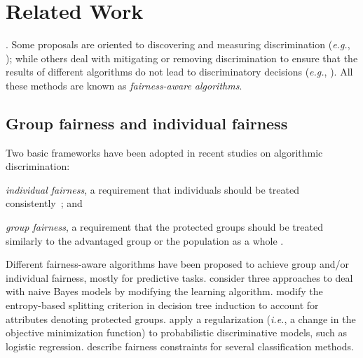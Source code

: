 \section{Related Work}\label{sec:related-work}

\cite{tuto2016,rosenbaum2019algorithmic}. Some proposals are oriented to discovering and measuring discrimination ({\em e.g.}, \cite{peder2008,Bonchi2015,angwin_2016_machine}); while others deal with mitigating or removing discrimination to ensure that the results of different algorithms do not lead to discriminatory decisions
({\em e.g.}, \cite{CaldersICDM,HajianFerrer12,hajian2014,Dwork2012,Zemel2013}).
%
All these methods are known as \emph{fairness-aware algorithms}.

\subsection{Group fairness and individual fairness}
Two basic frameworks have been adopted in recent studies on algorithmic discrimination: \begin{inparaenum}[(i)]
	\item \emph{individual fairness}, a requirement that individuals should be treated consistently~\cite{Dwork2012, zliobaite2015survey}; and
	\item \emph{group fairness},  a requirement that the protected groups should be treated similarly to the advantaged group or the population as a whole \cite{peder2008,pederruggi2009}.
\end{inparaenum}
%

Different fairness-aware algorithms have been proposed to achieve group and/or individual fairness, mostly for predictive tasks. \citet{Calders2010} consider three approaches to deal with naive Bayes models by modifying the learning algorithm.
\citet{CaldersICDM} modify the entropy-based splitting criterion in decision tree induction to account for attributes denoting protected groups.
\citet{Kamishima2012}  apply a regularization ({\em i.e.}, a
change in the objective minimization function) to probabilistic discriminative models, such
as logistic regression. \citet{zafar2015} describe fairness constraints for several classification methods.

